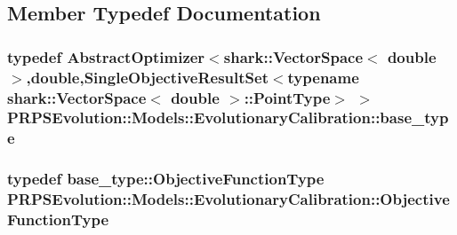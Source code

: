 \subsection{\-Member \-Typedef \-Documentation}
\hypertarget{struct_p_r_p_s_evolution_1_1_models_1_1_evolutionary_calibration_aa7969f9a9c8eda5919cac2a20344151f}{
\subsubsection[{base\-\_\-type}]{\setlength{\rightskip}{0pt plus 5cm}typedef \-Abstract\-Optimizer$<$shark\-::\-Vector\-Space$<$ double $>$,double,\-Single\-Objective\-Result\-Set$<$typename shark\-::\-Vector\-Space$<$ double $>$\-::\-Point\-Type$>$ $>$ {\bf \-P\-R\-P\-S\-Evolution\-::\-Models\-::\-Evolutionary\-Calibration\-::base\-\_\-type}}}\label{struct_p_r_p_s_evolution_1_1_models_1_1_evolutionary_calibration_aa7969f9a9c8eda5919cac2a20344151f}
\hypertarget{struct_p_r_p_s_evolution_1_1_models_1_1_evolutionary_calibration_a591c286e6ffdb08ea30590f82b63b1f2}{
\subsubsection[{\-Objective\-Function\-Type}]{\setlength{\rightskip}{0pt plus 5cm}typedef base\-\_\-type\-::\-Objective\-Function\-Type {\bf \-P\-R\-P\-S\-Evolution\-::\-Models\-::\-Evolutionary\-Calibration\-::\-Objective\-Function\-Type}}}\label{struct_p_r_p_s_evolution_1_1_models_1_1_evolutionary_calibration_a591c286e6ffdb08ea30590f82b63b1f2}


